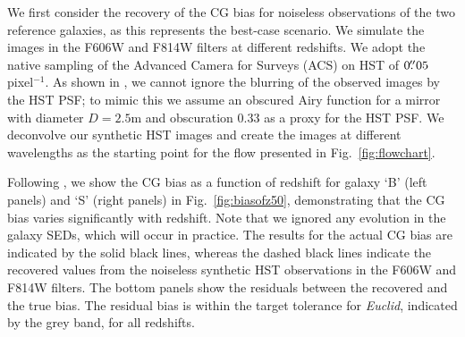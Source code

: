 \documentclass[useAMS,usenatbib]{mnras}
\begin{document}
We first consider the recovery of the CG bias for noiseless observations of the two reference galaxies, as this represents the best-case scenario. We simulate the images in the F606W and F814W filters at different redshifts. We adopt the native sampling of the Advanced Camera for Surveys (ACS) on HST of  $0\hbox{$.\!\!^{\prime\prime}$}05$ pixel$^{-1}$. As shown in , we cannot ignore the blurring of the observed images by the HST PSF; to mimic this we assume an obscured Airy function for a mirror with diameter $D=2.5$m and obscuration  $0.33$ as a proxy for the HST PSF. We deconvolve our synthetic HST images and create the images at different wavelengths as the starting point for the flow presented in Fig.~\ref{fig:flowchart}.

Following , we show  the CG bias as a function of redshift for galaxy `B' (left panels) and `S' (right panels) in Fig.~\ref{fig:biasofz50}, demonstrating that the CG bias varies significantly with redshift. Note that we ignored any evolution in the galaxy SEDs, which will occur in practice. The results for the actual CG bias are indicated by the solid black lines, whereas the dashed black lines indicate the recovered values from the noiseless synthetic HST observations in the F606W and F814W filters.  The bottom panels show the residuals between the recovered and the true bias. The residual bias is within the target tolerance for {\it Euclid}, indicated by the grey band, for all redshifts.
\end{document}
